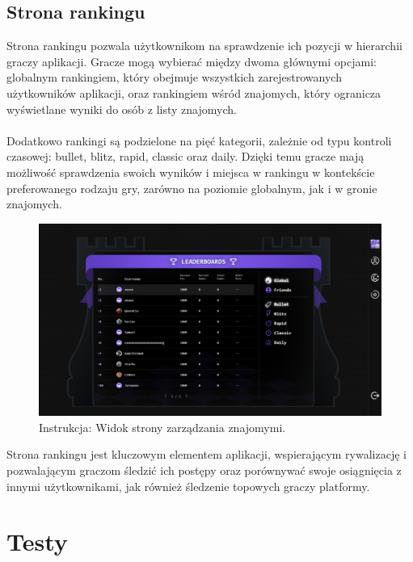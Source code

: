 \documentclass[12pt,a4paper]{article}
\begin{document}
\newpage

\subsection{Strona rankingu}
Strona rankingu pozwala użytkownikom na sprawdzenie ich pozycji w hierarchii graczy aplikacji. Gracze mogą wybierać między dwoma głównymi opcjami: globalnym rankingiem, który obejmuje wszystkich zarejestrowanych użytkowników aplikacji, oraz rankingiem wśród znajomych, który ogranicza wyświetlane wyniki do osób z listy znajomych.
\\\\
Dodatkowo rankingi są podzielone na pięć kategorii, zależnie od typu kontroli czasowej: bullet, blitz, rapid, classic oraz daily. Dzięki temu gracze mają możliwość sprawdzenia swoich wyników i miejsca w rankingu w kontekście preferowanego rodzaju gry, zarówno na poziomie globalnym, jak i w gronie znajomych.

\vspace{0.5cm}
\begin{figure}[h!]
    \centering
    \includegraphics[width=1\textwidth]{images/ins_rank.png}
    \caption{Instrukcja: Widok strony zarządzania znajomymi.}
\end{figure}
\vspace{0.5cm}

\noindent
Strona rankingu jest kluczowym elementem aplikacji, wspierającym rywalizację i pozwalającym graczom śledzić ich postępy oraz porównywać swoje osiągnięcia z innymi użytkownikami, jak również śledzenie topowych graczy platformy.

\newpage

\section{Testy}
\end{document}
